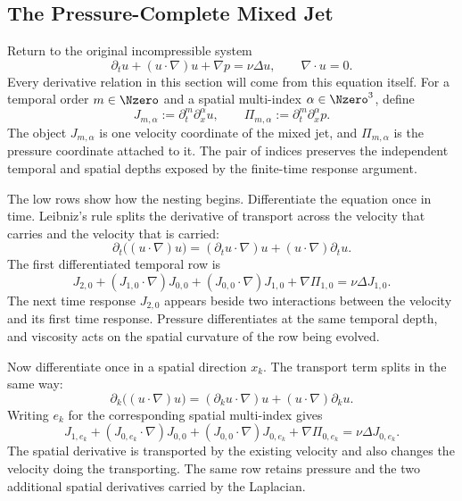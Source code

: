 
\subsection{The Pressure-Complete Mixed Jet}\label{sub:ThePressureCompleteMixedJet}

Return to the original incompressible system
\[
  \partial_tu+(u\cdot\nabla)u+\nabla p
  =\nu\Delta u,
  \qquad
  \nabla\cdot u=0.
\]
Every derivative relation in this section will come from this equation itself.
For a temporal order \(m\in\Nzero\) and a spatial multi-index \(\alpha\in\Nzero^3\), define
\[
  J_{m,\alpha}
  :=
  \partial_t^m\partial_x^\alpha u,
  \qquad
  \Pi_{m,\alpha}
  :=
  \partial_t^m\partial_x^\alpha p.
\]
The object \(J_{m,\alpha}\) is one velocity coordinate of the mixed jet, and \(\Pi_{m,\alpha}\) is the pressure coordinate attached to it.
The pair of indices preserves the independent temporal and spatial depths exposed by the finite-time response argument.

The low rows show how the nesting begins.
Differentiate the equation once in time.
Leibniz's rule splits the derivative of transport across the velocity that carries and the velocity that is carried:
\[
  \partial_t\bigl((u\cdot\nabla)u\bigr)
  =
  (\partial_tu\cdot\nabla)u
  +(u\cdot\nabla)\partial_tu.
\]
The first differentiated temporal row is
\[
  J_{2,0}
  +(J_{1,0}\cdot\nabla)J_{0,0}
  +(J_{0,0}\cdot\nabla)J_{1,0}
  +\nabla\Pi_{1,0}
  =
  \nu\Delta J_{1,0}.
\]
The next time response \(J_{2,0}\) appears beside two interactions between the velocity and its first time response.
Pressure differentiates at the same temporal depth, and viscosity acts on the spatial curvature of the row being evolved.

Now differentiate once in a spatial direction \(x_k\).
The transport term splits in the same way:
\[
  \partial_k\bigl((u\cdot\nabla)u\bigr)
  =
  (\partial_ku\cdot\nabla)u
  +(u\cdot\nabla)\partial_ku.
\]
Writing \(e_k\) for the corresponding spatial multi-index gives
\[
  J_{1,e_k}
  +(J_{0,e_k}\cdot\nabla)J_{0,0}
  +(J_{0,0}\cdot\nabla)J_{0,e_k}
  +\nabla\Pi_{0,e_k}
  =
  \nu\Delta J_{0,e_k}.
\]
The spatial derivative is transported by the existing velocity and also changes the velocity doing the transporting.
The same row retains pressure and the two additional spatial derivatives carried by the Laplacian.

